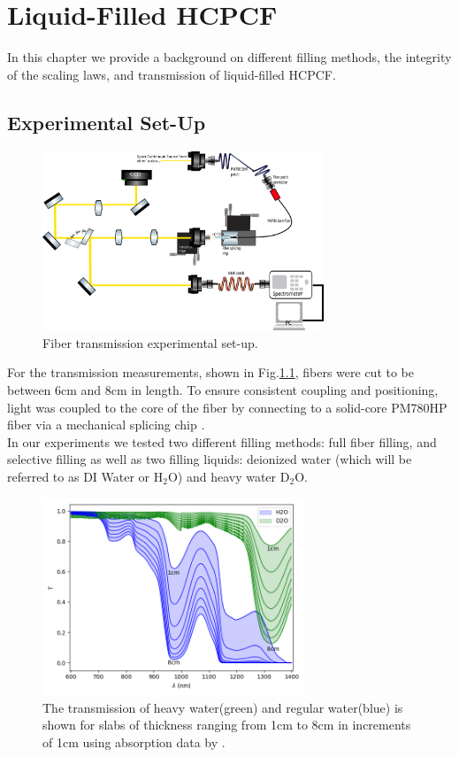 \chapter{Liquid-Filled HCPCF}
In this chapter we provide a background on different filling methods, the integrity of the scaling laws, and transmission of liquid-filled HCPCF.
\section{Experimental Set-Up}
\begin{figure}[!htb]
	\centering
	\includegraphics[width=0.75\textwidth]{./Figures/fiberfilling/Transmission_SetUp.png}
	\caption{Fiber transmission experimental set-up.}
	\label{fig:filling exp}
\end{figure}
For the transmission measurements, shown in Fig.\ref{fig:filling exp}, fibers were cut to be between 6cm and 8cm in length. To ensure consistent coupling and positioning, light was coupled to the core of the fiber by connecting to a solid-core PM780HP fiber via a mechanical splicing chip \cite{maruf}.\\
In our experiments we tested two different filling methods: full fiber filling, and selective filling as well as two filling liquids: deionized water (which will be referred to as DI Water or H${}_2$O) and heavy water D${}_2$O.
\begin{figure}[!htb]
	\centering
	\includegraphics[width=0.7\textwidth]{./Figures/fiberfilling/water_transmission/water_transmission.png}
	\caption{The transmission of heavy water(green) and regular water(blue) is shown for slabs of thickness ranging from 1cm to 8cm in increments of 1cm using absorption data by \cite{kedenburg}. }
	\label{fig:water transmission}
\end{figure}
